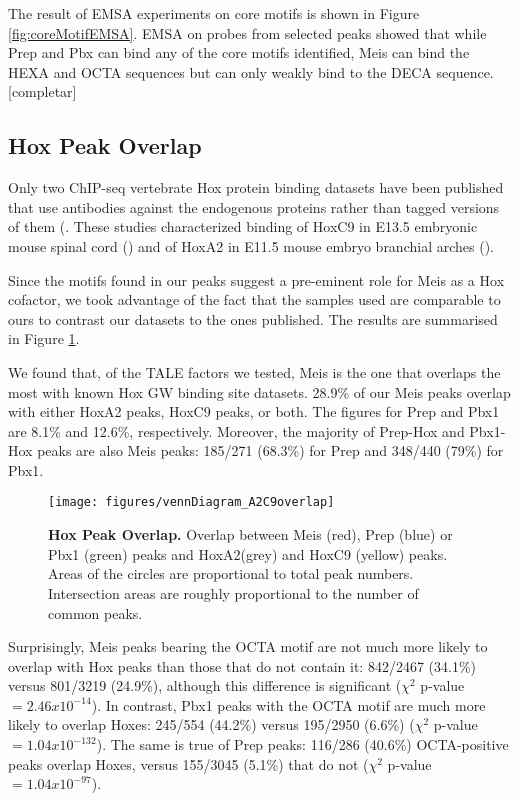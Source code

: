 The result of \ac{EMSA} experiments on core motifs is shown in Figure \ref{fig:coreMotifEMSA}. \ac{EMSA} on probes from selected peaks showed that while Prep and Pbx can bind any of the core motifs identified, Meis can bind the HEXA and OCTA sequences but can only weakly bind to the DECA sequence. [completar]

\subsection{Hox Peak Overlap}

Only two ChIP-seq vertebrate Hox protein binding datasets have been published that use antibodies against the endogenous proteins rather than tagged versions of them (\cite{Jung2010,Donaldson2012}. These studies characterized binding of HoxC9 in E13.5 embryonic mouse spinal cord (\cite{Jung2010}) and of HoxA2 in E11.5 mouse embryo branchial arches (\cite{Donaldson2012}).

Since the motifs found in our peaks suggest a pre-eminent role for Meis as a Hox cofactor, we took advantage of the fact that the samples used are comparable to ours to contrast our datasets to the ones published. The results are summarised in Figure \ref{fig:HoxOverlap}.

We found that, of the \ac{TALE} factors we tested, Meis is the one that overlaps the most with known Hox \ac{GW} binding site datasets. 28.9\% of our Meis peaks overlap with either HoxA2 peaks, HoxC9 peaks, or both. The figures for Prep and Pbx1 are 8.1\% and 12.6\%, respectively. Moreover, the majority of Prep-Hox and Pbx1-Hox peaks are also Meis peaks: 185/271 (68.3\%) for Prep and 348/440 (79\%) for Pbx1. 

\begin{figure}[]
  \centering
  \texttt{[image: figures/vennDiagram\_A2C9overlap]}
  \caption[Hox Peak Overlap]{\textbf{Hox Peak Overlap.} Overlap between Meis (red), Prep (blue) or Pbx1 (green) peaks and HoxA2(grey) and HoxC9 (yellow) peaks. Areas of the circles are proportional to total peak numbers. Intersection areas are roughly proportional to the number of common peaks.}
  \label{fig:HoxOverlap}
\end{figure}

Surprisingly, Meis peaks bearing the \ac{OCTA} motif are not much more likely to overlap with Hox peaks than those that do not contain it: 842/2467 (34.1\%) versus 801/3219 (24.9\%), although this difference is significant ($\chi^2$ p-value $= 2.46 x 10^{-14}$). In contrast, Pbx1 peaks with the \ac{OCTA} motif are much more likely to overlap Hoxes: 245/554 (44.2\%) versus 195/2950 (6.6\%) ($\chi^2$ p-value $= 1.04 x 10^{-132}$). The same is true of Prep peaks: 116/286 (40.6\%) \ac{OCTA}-positive peaks overlap Hoxes, versus 155/3045 (5.1\%) that do not ($\chi^2$ p-value $= 1.04 x 10^{-97}$).%

